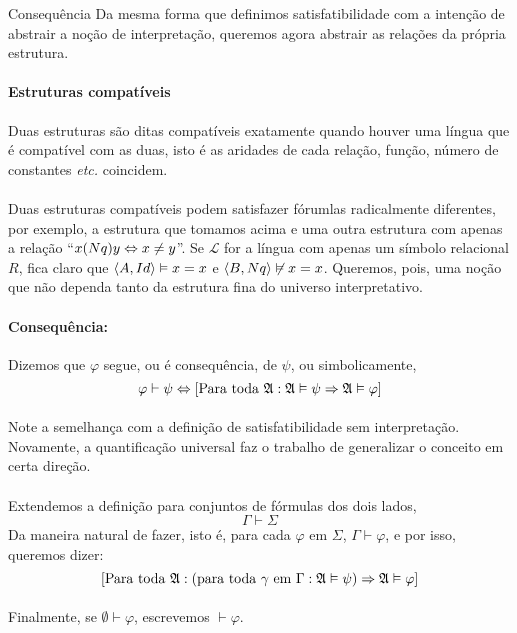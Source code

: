     \begin{definition}{Consequência}
        Da mesma forma que definimos satisfatibilidade com a intenção
        de abstrair a noção de interpretação, queremos agora abstrair
        as relações da própria estrutura.

        \paragraph{Estruturas compatíveis}
            Duas estruturas são ditas compatíveis exatamente quando 
            houver uma língua que é compatível com as duas, isto é 
            as aridades de cada relação, função, número de constantes
            \emph{etc.} coincidem.

        \paragraph{}
            Duas estruturas compatíveis podem satisfazer fórumlas 
            radicalmente diferentes, por exemplo, a estrutura que 
            tomamos acima e uma outra estrutura com apenas a 
            relação ``$x (Nq) y\Leftrightarrow x\not=y$''. Se $\mathcal{L}$ for a língua 
            com apenas um símbolo relacional $R$, fica claro que 
            $\TUPLE{A}{Id}\vDash x = x$ e $\TUPLE{B}{Nq}\not\vDash x = x$.
            Queremos, pois, uma noção que não dependa tanto da estrutura fina
            do universo interpretativo.

        \paragraph{Consequência:}
            Dizemos que $\varphi$ segue, ou é consequência, de $\psi$, ou simbolicamente,
            $$ \varphi\vdash\psi \Leftrightarrow [\text{Para toda }\mathfrak{A}:\mathfrak{A}\vDash\psi\Rightarrow\mathfrak{A}\vDash\varphi]$$
            \paragraph{}
                Note a semelhança com a definição de satisfatibilidade
                sem interpretação. Novamente, a quantificação universal
                faz o trabalho de generalizar o conceito em certa direção.
            \paragraph{}
                Extendemos a definição para conjuntos de fórmulas dos dois 
                lados,
            $$ \Gamma\vdash\Sigma $$
                Da maneira natural de fazer, isto é, para cada $\varphi$ em $\Sigma$,
                $ \Gamma\vdash\varphi $, e por isso, queremos dizer:
            $$ [\text{Para toda }\mathfrak{A}:(\text{para toda $\gamma$ em $\Gamma$}:\mathfrak{A}\vDash\psi)\Rightarrow\mathfrak{A}\vDash\varphi]$$
            \paragraph{}
                Finalmente, se $\emptyset\vdash\varphi$, escrevemos $\vdash\varphi$.
    \end{definition}
